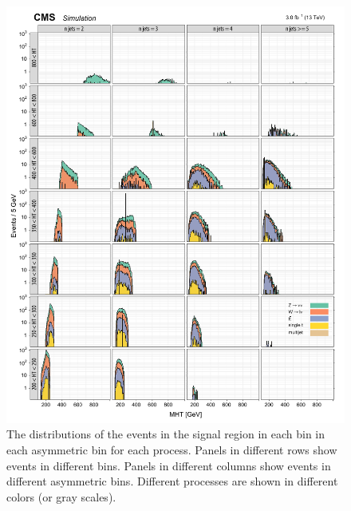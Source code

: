 \begin{figure}[!h]
\centering
\includegraphics[scale=0.95]{figures/kiplots/c150107_s150318_f015_MHT_40}
\caption{The \mht distributions of the events in the signal region in
each \scalht bin in each asymmetric \njet bin for each process. Panels
in different rows show events in different \scalht bins. Panels in
different columns show events in different asymmetric \njet bins.
Different processes are shown in different colors (or gray scales).}
\label{c150107_s150318_f015_MHT_40}
\end{figure}

